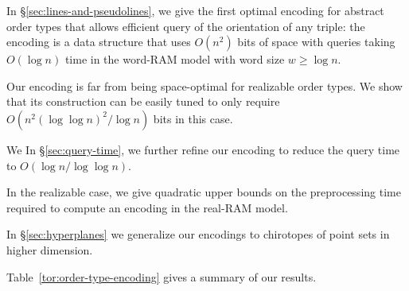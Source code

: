 In \S\ref{sec:lines-and-pseudolines}, we
give the first optimal encoding for abstract
order types that allows efficient query of the orientation of any triple: the
encoding is a data structure that uses \( O(n^2) \) bits of space with queries
taking \(O(\log n)\) time in the word-RAM model with word size \(w \geq \log
n\).

%
Our encoding is far from being space-optimal for realizable order types.
We show that its construction can be easily tuned to only require \(O(n^2
{(\log{\log{n}})}^2 / \log{n})\) bits in this case.

%
\ifeurocg%
We \else%
In \S\ref{sec:query-time}, we \fi%
further refine our encoding to
reduce the query time to \(O(\log{n}/\log{\log{n}})\).


%
In the realizable case, we give quadratic upper bounds on the
preprocessing time required to compute an encoding in the real-RAM model.


%
In \S\ref{sec:hyperplanes} we
generalize our encodings to chirotopes of
point sets in higher dimension.



Table~\ref{tor:order-type-encoding} gives a summary of our results.


